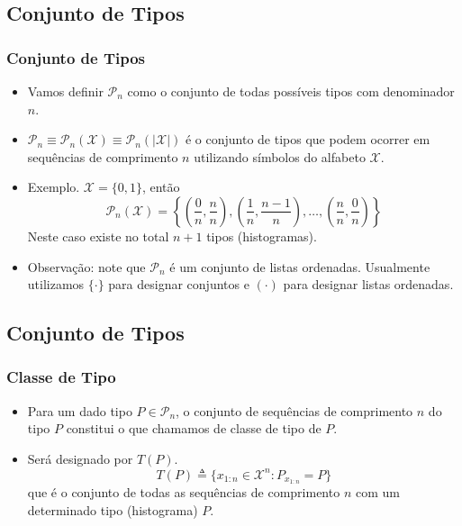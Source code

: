 \subsection{Conjunto de Tipos}
\begin{frame}[allowframebreaks]
  \frametitle{Conjunto de Tipos}
  \begin{itemize}
  \item Vamos definir $\mathcal{P}_n$ como o conjunto de todas possíveis tipos com denominador $n$.
  \item $\mathcal{P}_n \equiv \mathcal{P}_n(\mathcal{X}) \equiv \mathcal{P}_n(\vert \mathcal{X} \vert)$ é o conjunto de
	tipos que podem ocorrer em sequências de comprimento $n$ utilizando símbolos do alfabeto $\mathcal{X}$.
  \item Exemplo. $\mathcal{X} = \{0,1\}$, então
	\begin{equation}
	\mathcal{P}_n (\mathcal{X}) = \left\{ \left( \frac{0}{n}, \frac{n}{n} \right), \left( \frac{1}{n} , \frac{n-1}{n} \right), \ldots, \left( \frac{n}{n}, \frac{0}{n} \right)\right\}
	\end{equation}
	Neste caso existe no total $n+1$ tipos (histogramas).
  \item Observação: note que $\mathcal{P}_n$ é um conjunto de listas ordenadas. Usualmente utilizamos $\{ \cdot \}$ para designar
	conjuntos e $(\cdot)$ para designar listas ordenadas.
  \end{itemize}
\end{frame}


\subsection{Conjunto de Tipos}
\begin{frame}[allowframebreaks]
  \frametitle{Classe de Tipo}
  \begin{itemize}
  \item Para um dado tipo $P \in \mathcal{P}_n$, o conjunto de sequências de comprimento $n$ do tipo $P$
	constitui o que chamamos de classe de tipo de $P$.
  \item Será designado por $T(P)$.
	\begin{equation}
	T(P) \triangleq \{ x_{1:n} \in \mathcal{X}^n : P_{x_{1:n}} = P \}
	\end{equation}
	que é o conjunto de todas as sequências de comprimento $n$ com um determinado tipo (histograma) $P$.
  \end{itemize}
\end{frame}


